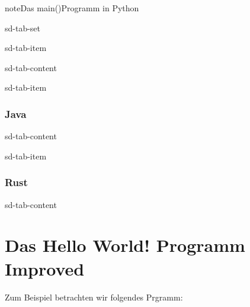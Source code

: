 \documentclass[letterpaper,10pt,english]{jupyterBook}
\begin{document}
\begin{sphinxadmonition}{note}{Das main()\sphinxhyphen{}Programm in Python}
\begin{sphinxuseclass}{sd-tab-set}
\begin{sphinxuseclass}{sd-tab-item}
\begin{sphinxuseclass}{sd-tab-content}
\end{sphinxuseclass}
\end{sphinxuseclass}
\begin{sphinxuseclass}{sd-tab-item}\subsubsection*{Java}

\begin{sphinxuseclass}{sd-tab-content}
\begin{sphinxVerbatim}[commandchars=\\\{\}]
 
\PYG{o}{[}\PYG{o}{]}
\end{sphinxVerbatim}

\end{sphinxuseclass}
\end{sphinxuseclass}
\begin{sphinxuseclass}{sd-tab-item}\subsubsection*{Rust}

\begin{sphinxuseclass}{sd-tab-content}
\begin{sphinxVerbatim}[commandchars=\\\{\}]
 
\end{sphinxVerbatim}

\end{sphinxuseclass}
\end{sphinxuseclass}
\end{sphinxuseclass}\end{sphinxadmonition}


\section{Das Hello World! \sphinxhyphen{} Programm Improved}
\label{\detokenize{Notebooks/HelloWorld:das-hello-world-programm-improved}}
\sphinxAtStartPar
Zum Beispiel betrachten wir folgendes Prgramm:
\end{document}
